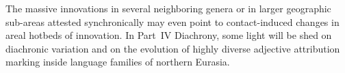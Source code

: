 The massive innovations in several neighboring genera or in larger geographic sub-areas attested synchronically may even point to contact-induced changes in areal hotbeds of innovation. In Part~IV Diachrony, some light will be shed on diachronic variation and on the evolution of highly diverse adjective attribution marking inside language families of northern Eurasia.
